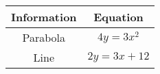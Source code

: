 \begin{tabular}[12pt]{|c|c|}
    \hline
	\textbf{Information} & \textbf{Equation}\\ 
    \hline
	Parabola & $4y=3x^2$ \\
    \hline 
	Line & $2y=3x+12$ \\
    \hline   
    \end{tabular}

